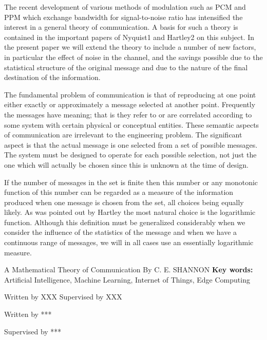 \begin{eabstract}
	The recent development of various methods of modulation such as PCM and PPM which exchange bandwidth for signal-to-noise ratio has intensified the interest in a general theory of communication. A basis for such a theory is contained in the important papers of Nyquist1 and Hartley2 on this subject. In the present paper we will extend the theory to include a number of new factors, in particular the effect of noise in the channel, and the savings possible due to the statistical structure of the original message and due to the nature of the final destination of the information.

	The fundamental problem of communication is that of reproducing at one point either exactly or approximately a message selected at another point. Frequently the messages have meaning; that is they refer to or are correlated according to some system with certain physical or conceptual entities. These semantic aspects of communication are irrelevant to the engineering problem. The significant aspect is that the actual message is one selected from a set of possible messages. The system must be designed to operate for each possible selection, not just the one which will actually be chosen since this is unknown at the time of design.
	
	If the number of messages in the set is finite then this number or any monotonic function of this number can be regarded as a measure of the information produced when one message is chosen from the set, all choices being equally likely. As was pointed out by Hartley the most natural choice is the logarithmic function. Although this definition must be generalized considerably when we consider the influence of the statistics of the message and when we have a continuous range of messages, we will in all cases use an essentially logarithmic measure.

	A Mathematical Theory of Communication By C. E. SHANNON
	\vskip 21bp
	{\bf{} Key words: }
	Artificial Intelligence,
	Machine Learning,
	Internet of Things,
	Edge Computing
\end{eabstract}

\iffinalversion
	\begin{flushright}
		Written by XXX
		Supervised by XXX
	\end{flushright}
\else
	\begin{flushright}
		Written by ***

		Supervised by ***
	\end{flushright}
\fi
